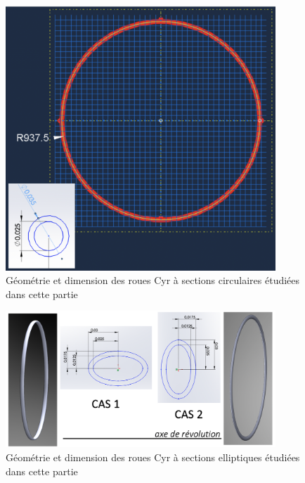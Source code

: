 \\
\\
\begin{figure}[htb]
\centering
\includegraphics[width=4in]{images_2ddl/geo1.png}
\caption{Géométrie et dimension des roues Cyr à sections circulaires étudiées dans cette partie}
\label{fig:geo1}
\end{figure}

\begin{figure}[htb]
\centering
\includegraphics[width=4in]{images_2ddl/geo2.png}
\caption{Géométrie et dimension des roues Cyr à sections elliptiques étudiées dans cette partie}
\label{fig:geo2}
\end{figure}


